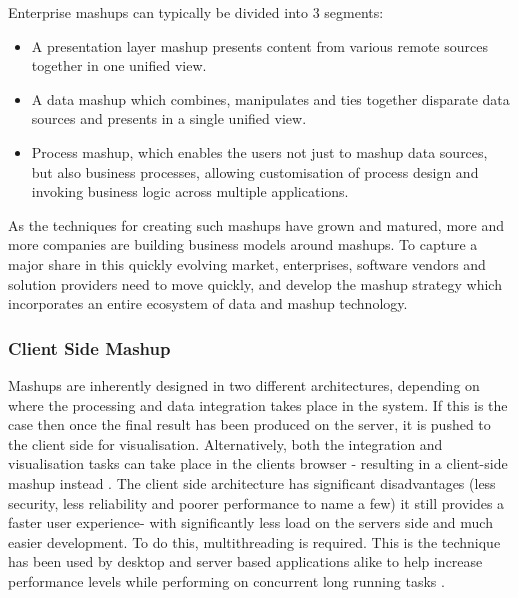 Enterprise mashups can typically be divided into 3 segments:
\begin{itemize}
\item  A presentation layer mashup presents content from various remote sources together in one unified view.
\item  A data mashup which combines, manipulates and ties together disparate data sources and presents in a single unified view. 
\item  Process mashup, which enables the users not just to mashup data sources, but also business processes, allowing customisation of process design and invoking business logic across multiple applications. 
\end{itemize}

As the techniques for creating such mashups have grown and matured, more and more companies are building business models around mashups. To capture a major share in this quickly evolving market, enterprises, software vendors and solution providers need to move quickly, and develop the mashup strategy which incorporates an entire ecosystem of data and mashup technology.


\subsubsection{Client Side Mashup}

Mashups are inherently designed in two different architectures, depending on where the processing and data integration takes place in the system. If this is the case then once the final result has been produced on the server, it is pushed to the client side for visualisation. Alternatively, both the integration and visualisation tasks can take place in the clients browser - resulting in a client-side mashup instead \cite{yu2008understanding}. The client side architecture has significant disadvantages (less security, less reliability and poorer performance to name a few) it still provides a faster user experience- with significantly less load on the servers side and much easier development. To do this, multithreading is required. This is the technique has been used by desktop and server based applications alike to help increase performance levels while performing on concurrent long running tasks \cite{patel2015novel}. 

